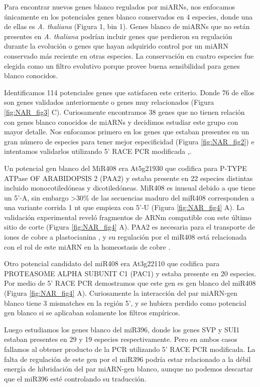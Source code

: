 Para encontrar nuevos genes blanco regulados por miARNs, nos enfocamos únicamente  en los potenciales genes blanco conservados en 4 especies, donde una de ellas es \textit{A. thaliana} (Figura 1, bin 1). 
Genes blanco de miARNs que no están presentes en \textit{A. thaliana} podrían incluir genes que perdieron su regulación durante la evolución o genes que hayan adquirido control por un miARN conservado más reciente en otras especies.
La conservación en cuatro especies fue elegida como un filtro evolutivo porque provee buena sensibilidad para genes blanco conocidos.

Identificamos 114 potenciales genes que satisfacen este criterio. Donde 76 de ellos son genes validados anteriormente o genes muy relacionados (Figura \ref{fig:NAR_fig3} C).
Curiosamente encontramos 38 genes que no tienen relación con genes blanco conocidos de miARNs y decidimos estudiar este grupo con mayor detalle.
Nos enfocamos primero en los genes que estaban presentes en un gran número de especies para tener mejor especificidad (Figura \ref{fig:NAR_fig2}) e intentamos validarlos utilizando 5' RACE PCR modificada \citep{Llave2002},\citep{Kasschau2003}.

Un potencial gen blanco del MiR408 era At5g21930 que codifica para P-TYPE ATPase OF ARABIDOPSIS 2 (PAA2) y estaba presente en 22 especies distintas incluido monocotiledóneas y dicotiledóneas.
MiR408 es inusual debido a que tiene un 5'-A, sin embargo >30\% de las secuencias maduro del miR408 corresponden a una variante corrida 1 nt que empieza con 5'-U \citep{Maunoury2011} (Figura \ref{fig:NAR_fig4} A).
La validación experimental reveló fragmentos de ARNm compatible con este último sitio de corte (Figura \ref{fig:NAR_fig4} A). 
PAA2 es necesaria para el transporte de iones de cobre a plastocianina \citep{Niyogi2005}, y su regulación por el miR408 está relacionada con el rol de este miARN en la homeostasis de cobre \citep{Yamasaki2007}.

Otro potencial candidato del miR408 era At3g22110 que codifica para PROTEASOME ALPHA SUBUNIT C1 (PAC1) y estaba presente en 20 especies. Por medio de 5' RACE PCR demostramos que este gen es gen blanco del miR408 (Figura \ref{fig:NAR_fig4} A). 
Curiosamente la interacción del par miARN-gen blanco tiene 3 mismatches en la región 5', y se hubiera perdido como potencial gen blanco si se aplicaban solamente los filtros empíricos.

Luego estudiamos los genes blanco del miR396, donde los genes SVP y SUI1 estaban presentes en 29 y 19 especies respectivamente.
Pero en ambos casos fallamos al obtener producto de la PCR utilizando 5' RACE PCR modificada.
La falta de regulación de este gen por el miR396 podría estar relacionado a la débil energía de hibridación del par miARN-gen blanco, aunque no podemos descartar que el miR396 esté controlando su traducción.

